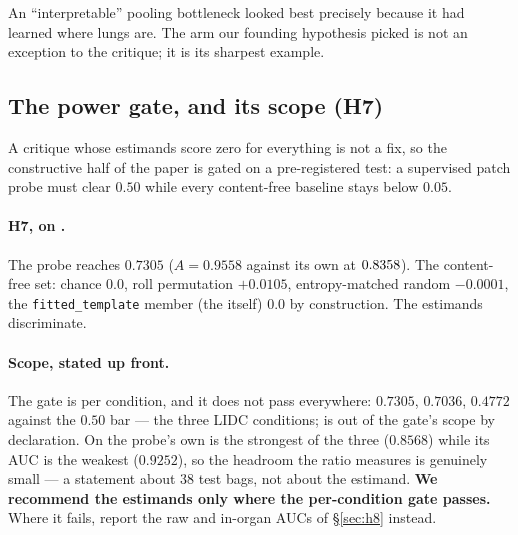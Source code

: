 \documentclass[10pt]{article}
\begin{document}
An ``interpretable'' pooling bottleneck looked best precisely because it had
learned where lungs are. The arm our founding hypothesis picked is not an
exception to the critique; it is its sharpest example.

\begin{table}[t]
\centering

\caption{Raw and in-lung instance AUC of each arm's \emph{own} frozen-slot
attention (mean over five seeds, \condA{}; patient-clustered bootstrap per
seed). Recommendation~1 applied to this paper's own arms: the scored quantity
here is the attention itself, not the \attden{} of Figure~\ref{fig:lung}.
Raw values are verified against the confirmatory
\texttt{template\_family.json} at generation time.}
\label{tab:armlung}
\end{table}

\subsection{The power gate, and its scope (H7)}

A critique whose estimands score zero for everything is not a fix, so the
constructive half of the paper is gated on a pre-registered test: a supervised
patch probe must clear $0.50$ \pns{} while every content-free baseline stays
below $0.05$.

\paragraph{H7, \PASS{} on \condA{}.} The probe reaches $0.7305$
($A = 0.9558$ against its own \attden{} at $0.8358$). The content-free set:
chance $0.0$, roll permutation $+0.0105$, entropy-matched random $-0.0001$,
the \texttt{fitted\_template} member (the \attden{} itself) $0.0$ by
construction. The estimands discriminate.

\paragraph{Scope, stated up front.} The gate is per condition, and it does not
pass everywhere: \condA{} $0.7305$, \condB{} $0.7036$, \condC{}
$\mathbf{0.4772}$ against the $0.50$ bar --- the three LIDC conditions;
\condD{} is out of the gate's scope by declaration. On \condC{} the probe's own
\attden{} is the strongest of the three ($0.8568$) while its AUC is the weakest
($0.9252$), so the headroom the ratio measures is genuinely small --- a statement
about $38$ test bags, not about the estimand. \textbf{We recommend the
estimands only where the per-condition gate passes.} Where it fails, report the
raw and in-organ AUCs of \S\ref{sec:h8} instead.
\end{document}
